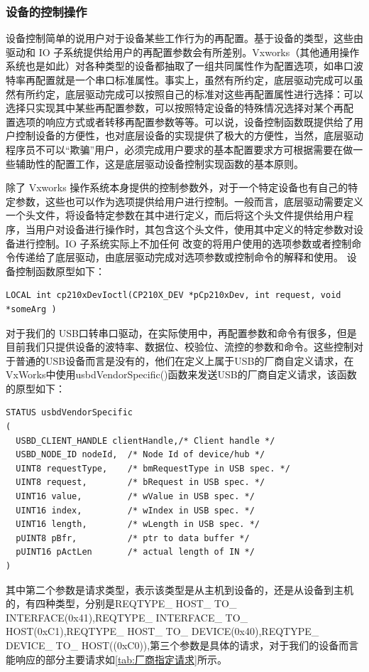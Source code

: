\subsubsection{设备的控制操作}
	设备控制简单的说用户对于设备某些工作行为的再配置。基于设备的类型，这些由驱动和 IO 子系统提供给用户的再配置参数会有所差别。Vxworks（其他通用操作系统也是如此）对各种类型的设备都抽取了一组共同属性作为配置选项，如串口波特率再配置就是一个串口标准属性。事实上，虽然有所约定，底层驱动完成可以虽然有所约定，底层驱动完成可以按照自己的标准对这些再配置属性进行选择：可以选择只实现其中某些再配置参数，可以按照特定设备的特殊情况选择对某个再配
置选项的响应方式或者转移再配置参数等等。可以说，设备控制函数既提供给了用户控制设备的方便性，也对底层设备的实现提供了极大的方便性，当然，底层驱动程序员不可以“欺骗”用户，必须完成用户要求的基本配置要求方可根据需要在做一些辅助性的配置工作，这是底层驱动设备控制实现函数的基本原则。

	除了 Vxworks 操作系统本身提供的控制参数外，对于一个特定设备也有自己的特定参数，这些也可以作为选项提供给用户进行控制。一般而言，底层驱动需要定义一个头文件，将设备特定参数在其中进行定义，而后将这个头文件提供给用户程序，当用户对设备进行操作时，其包含这个头文件，使用其中定义的特定参数对设备进行控制。IO 子系统实际上不加任何
改变的将用户使用的选项参数或者控制命令传递给了底层驱动，由底层驱动完成对选项参数或控制命令的解释和使用。
设备控制函数原型如下：
\lstset{language=C}
\begin{lstlisting}
LOCAL int cp210xDevIoctl(CP210X_DEV *pCp210xDev, int request, void *someArg )
\end{lstlisting}

对于我们的 USB口转串口驱动，在实际使用中，再配置参数和命令有很多，但是目前我们只提供设备的波特率、数据位、校验位、流控的参数和命令。这些控制对于普通的USB设备而言是没有的，他们在定义上属于USB的厂商自定义请求，在VxWorks中使用usbdVendorSpecific()函数来发送USB的厂商自定义请求，该函数的原型如下：
\lstset{language=C}
\begin{lstlisting}
STATUS usbdVendorSpecific
(
  USBD_CLIENT_HANDLE clientHandle,/* Client handle */
  USBD_NODE_ID nodeId,	/* Node Id of device/hub */
  UINT8 requestType,	/* bmRequestType in USB spec. */
  UINT8 request,		/* bRequest in USB spec. */
  UINT16 value,			/* wValue in USB spec. */
  UINT16 index,			/* wIndex in USB spec. */
  UINT16 length,		/* wLength in USB spec. */
  pUINT8 pBfr,			/* ptr to data buffer */
  pUINT16 pActLen		/* actual length of IN */
)
\end{lstlisting}
其中第二个参数是请求类型，表示该类型是从主机到设备的，还是从设备到主机的，有四种类型，分别是REQTYPE\_ HOST\_ TO\_ INTERFACE(0x41),REQTYPE\_ INTERFACE\_ TO\_ HOST(0xC1),REQTYPE\_ HOST\_ TO\_ DEVICE(0x40),REQTYPE\_ DEVICE\_ TO\_ HOST((0xC0)),第三个参数是具体的请求，对于我们的设备而言能响应的部分主要请求如\autoref{tab:厂商指定请求}所示。

